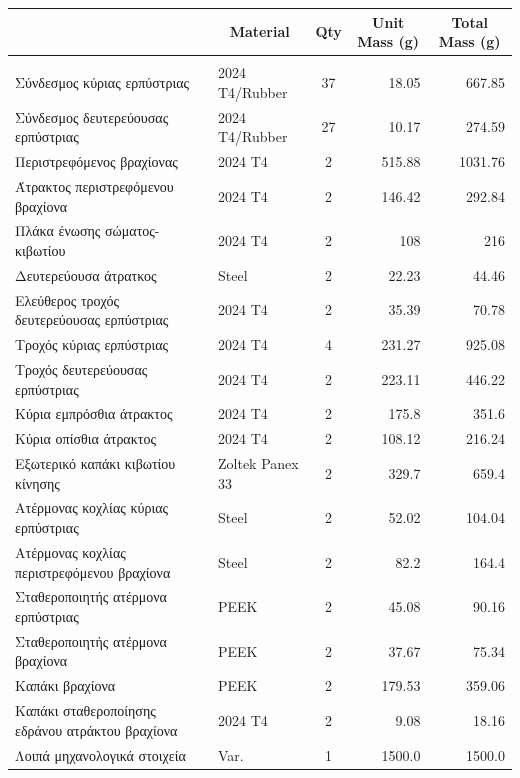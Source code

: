 \begin{table}[H]
    \centering
\begin{tabular}{|l|l|c|r|r|}
\hline
\rowcolor{Periwinkle}
\multicolumn{1}{|c|}{Part} & \multicolumn{1}{c|}{Material} & \multicolumn{1}{c|}{Qty} & \multicolumn{1}{c|}{Unit Mass (g)} & \multicolumn{1}{c|}{Total Mass (g)} \\
\hline
\rowcolor{YellowGreen}
\multicolumn{5}{|c|}{Mobility Subsystem} \\
\hline
Σύνδεσμος κύριας ερπύστριας & 2024 Τ4/Rubber & 37 & 18.05 & 667.85 \\
\hline
Σύνδεσμος δευτερεύουσας ερπύστριας & 2024 Τ4/Rubber & 27 & 10.17 & 274.59 \\
\hline
Περιστρεφόμενος βραχίονας & 2024 T4 & 2 & 515.88 & 1031.76 \\
\hline
Άτρακτος περιστρεφόμενου βραχίονα & 2024 T4 & 2 & 146.42 & 292.84 \\
\hline
Πλάκα ένωσης σώματος-κιβωτίου & 2024 T4 & 2 & 108 & 216 \\
\hline
Δευτερεύουσα άτρατκος & Steel & 2 & 22.23 & 44.46 \\
\hline
Ελεύθερος τροχός δευτερεύουσας ερπύστριας & 2024 T4 & 2 & 35.39 & 70.78 \\
\hline
Τροχός κύριας ερπύστριας & 2024 T4 & 4 & 231.27 & 925.08 \\
\hline
Τροχός δευτερεύουσας ερπύστριας & 2024 T4 & 2 & 223.11 & 446.22 \\
\hline
Κύρια εμπρόσθια άτρακτος & 2024 T4 & 2 & 175.8 & 351.6 \\
\hline
Κύρια οπίσθια άτρακτος & 2024 T4 & 2 & 108.12 & 216.24 \\
\hline
Εξωτερικό καπάκι κιβωτίου κίνησης & Zoltek Panex 33 & 2 & 329.7 & 659.4 \\
\hline
Ατέρμονας κοχλίας κύριας ερπύστριας & Steel & 2 & 52.02 & 104.04 \\
\hline
Ατέρμονας κοχλίας περιστρεφόμενου βραχίονα & Steel & 2 & 82.2 & 164.4 \\
\hline
Σταθεροποιητής ατέρμονα ερπύστριας & PEEK & 2 & 45.08 & 90.16 \\
\hline
Σταθεροποιητής ατέρμονα βραχίονα & PEEK & 2 & 37.67 & 75.34 \\
\hline
Καπάκι βραχίονα & PEEK & 2 & 179.53 & 359.06 \\
\hline
Καπάκι σταθεροποίησης εδράνου ατράκτου βραχίονα & 2024 T4 & 2 & 9.08 & 18.16 \\
\hline
Λοιπά μηχανολογικά στοιχεία & Var. & 1 & 1500.0 & 1500.0 \\
\hline



\end{tabular}
\end{table}
